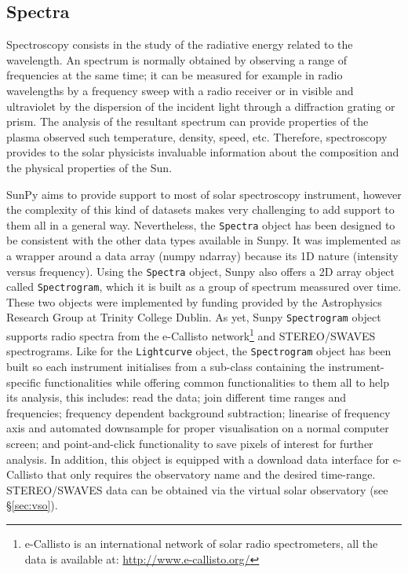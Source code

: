 \subsection{Spectra}\label{sec:spectra}

Spectroscopy consists in the study of the radiative energy related to the wavelength.
An spectrum is normally obtained by observing a range of frequencies at the same time; 
it can be measured for example in radio wavelengths by a frequency sweep with 
a radio receiver or in visible and ultraviolet by the dispersion of the incident light 
through a diffraction grating or prism.
The analysis of the resultant spectrum can provide properties of the plasma observed 
such temperature, density, speed, etc.
Therefore, spectroscopy provides to the solar physicists invaluable information about 
the composition and the physical properties of the Sun.  

SunPy aims to provide support to most of solar spectroscopy instrument, however the 
complexity of this kind of datasets makes very challenging to add support to them all 
in a general way.  
Nevertheless, the \texttt{Spectra} object has been designed to be consistent with the 
other data types available in Sunpy.
It was implemented as a wrapper around a data array (numpy ndarray)
because its 1D nature (intensity versus frequency).
Using the \texttt{Spectra} object, Sunpy also offers a 2D array object called \texttt{Spectrogram},
which it is built as a group of spectrum meassured over time.
These two objects were implemented by funding provided by the Astrophysics Research 
Group at Trinity College Dublin.
As yet, Sunpy \texttt{Spectrogram} object supports radio spectra from the e-Callisto 
network\footnote{e-Callisto is an international network of solar radio spectrometers, 
                 all the data is available at: \url{http://www.e-callisto.org/} } 
and STEREO/SWAVES spectrograms.
Like for the \texttt{Lightcurve} object, the \texttt{Spectrogram} object has been
built so each instrument initialises from a sub-class containing the instrument-specific 
functionalities while offering common functionalities to them all to help its analysis, 
this includes:
read the data; %
join different time ranges and frequencies; 
frequency dependent background subtraction;  
linearise of frequency axis and automated downsample for proper visualisation on a normal computer screen;  
and point-and-click functionality to save pixels of interest for further analysis.
In addition, this object is equipped with a download data interface for e-Callisto that 
only requires the observatory name and the desired time-range. 
STEREO/SWAVES data can be obtained via the virtual solar observatory (see \S\ref{sec:vso}).

